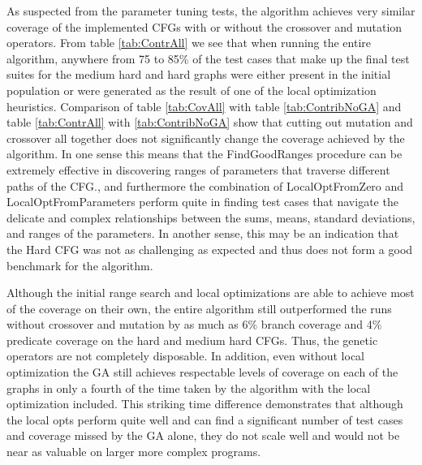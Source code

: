 \documentclass[runningheads]{llncs}
\begin{document}

As suspected from the parameter tuning tests, the algorithm achieves very similar coverage of the implemented CFGs with or without the crossover and mutation operators. From table \ref{tab:ContrAll} we see that when running the entire algorithm, anywhere from 75 to 85\% of the test cases that make up the final test suites for the medium hard and hard graphs were either present in the initial population or were generated as the result of one of the local optimization heuristics. Comparison of table \ref{tab:CovAll} with table \ref{tab:ContribNoGA} and table \ref{tab:ContrAll} with \ref{tab:ContribNoGA} show that cutting out mutation and crossover all together does not significantly change the coverage achieved by the algorithm. In one sense this means that the FindGoodRanges procedure can be extremely effective in discovering ranges of parameters that traverse different paths of the CFG., and furthermore the combination of LocalOptFromZero and LocalOptFromParameters perform quite in finding test cases that navigate the delicate and complex relationships between the sums, means, standard deviations, and ranges of the parameters. In another sense, this may be an indication that the Hard CFG was not as challenging as expected and thus does not form a good benchmark for the algorithm.

Although the initial range search and local optimizations are able to achieve most of the coverage on their own, the entire algorithm still outperformed the runs without crossover and mutation by as much as 6\% branch coverage and 4\% predicate coverage on the hard and medium hard CFGs. Thus, the genetic operators are not completely disposable. In addition, even without local optimization the GA still achieves respectable levels of coverage on each of the graphs in only a fourth of the time taken by the algorithm with the local optimization included. This striking time difference demonstrates that although the local opts perform quite well and can find a significant number of test cases and coverage missed by the GA alone, they do not scale well and would not be near as valuable on larger more complex programs. 
\end{document}
